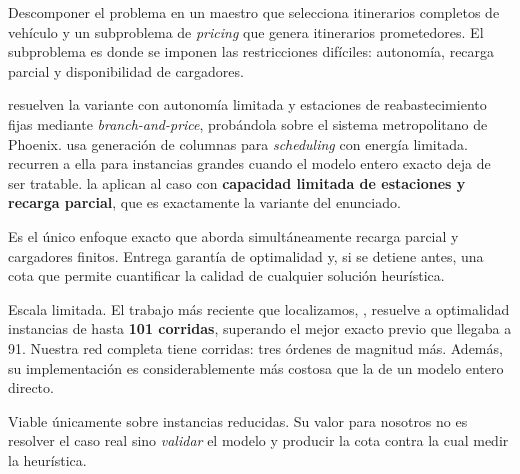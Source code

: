 \documentclass[11pt,a4paper,parskip=half]{scrartcl}
\begin{document}
\begin{campos}
\item[En qué consiste] Descomponer el problema en un maestro que selecciona itinerarios completos de vehículo y un subproblema de \textit{pricing} que genera itinerarios prometedores. El subproblema es donde se imponen las restricciones difíciles: autonomía, recarga parcial y disponibilidad de cargadores.
\item[Evidencia] \citet{adler_altfuelvsp_2017} resuelven la variante con autonomía limitada y estaciones de reabastecimiento fijas mediante \textit{branch-and-price}, probándola sobre el sistema metropolitano de Phoenix. \citet{li_limitedenergy_2014} usa generación de columnas para \textit{scheduling} con energía limitada. \citet{vankootenniekerk_schedulingev_2017} recurren a ella para instancias grandes cuando el modelo entero exacto deja de ser tratable. \citet{devos_capacitatedcharging_2024} la aplican al caso con \textbf{capacidad limitada de estaciones y recarga parcial}, que es exactamente la variante del enunciado.
\item[Ventajas] Es el único enfoque exacto que aborda simultáneamente recarga parcial y cargadores finitos. Entrega garantía de optimalidad y, si se detiene antes, una cota que permite cuantificar la calidad de cualquier solución heurística.
\item[Desventajas] Escala limitada. El trabajo más reciente que localizamos, \citet{wu_waitingtimebranchprice_2025}, resuelve a optimalidad instancias de hasta \textbf{101 corridas}, superando el mejor exacto previo que llegaba a 91. Nuestra red completa tiene \corridasReales{} corridas: tres órdenes de magnitud más. Además, su implementación es considerablemente más costosa que la de un modelo entero directo.
\item[Aplicabilidad] Viable únicamente sobre instancias reducidas. Su valor para nosotros no es resolver el caso real sino \emph{validar} el modelo y producir la cota contra la cual medir la heurística.
\end{campos}
\end{document}
